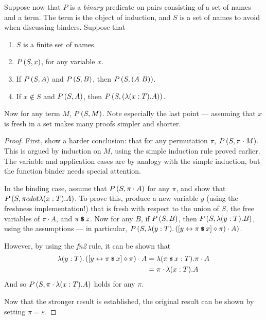 \begin{lemma}
Suppose now that \(P\) is a \emph{binary} predicate on pairs consisting of a set of names and a term.
The term is the object of induction, and \(S\) is a set of names to avoid when discussing binders.
Suppose that
\begin{enumerate}
\item
\(S\) is a finite set of names.
\item
\(P\left(S, x\right)\), for any variable \(x\).
\item
If \(P\left(S, A\right)\) and \(P\left(S, B\right)\), then \(P\left(S, \left(A\ B\right)\right)\).
\item
If \(x \notin S\) and \(P\left(S, A\right)\), then \(P\left(S, \left(\lambda (x:T). A\right)\right)\).
\end{enumerate}
Now for any term \(M\), \(P\left(S, M\right)\).
Note especially the last point --- assuming that \(x\) is fresh in a set makes many proofs simpler and shorter.
\end{lemma}
\begin{proof}
First, show a harder conclusion: that for any permutation \(\pi\), \(P\left(S, \pi \cdot M\right)\).
This is argued by induction on \(M\), using the simple induction rule proved earlier.
The variable and application cases are by analogy with the simple induction, but the function binder needs special attention.

In the binding case, assume that \(P\left(S, \pi \cdot A\right)\) for any \(\pi\), and show that \(P\left(S, \pi cdot \lambda (x:T).A\right)\).
To prove this, produce a new variable \(y\) (using the freshness implementation!) that is fresh with respect to the union of \(S\), the free variables of \(\pi \cdot A\), and \(\pi \mathbin{\textrm{\footnotesize{\textbf{\$}}}} z\).
Now for any \(B\), if \(P\left(S, B\right)\), then \(P\left(S, \lambda (y:T).B\right)\), using the assumptions --- in particular, \(P\left(S, \lambda (y:T). \left([y \leftrightarrow \pi \mathbin{\textrm{\footnotesize{\textbf{\$}}}} x] \diamond \pi\right) \cdot A\right)\).

However, by using the \emph{fn2} rule, it can be shown that
\begin{align*}
\lambda (y:T). \left([y \leftrightarrow \pi \mathbin{\textrm{\footnotesize{\textbf{\$}}}} x] \diamond \pi\right) \cdot A
&= \lambda (\pi \mathbin{\textrm{\footnotesize{\textbf{\$}}}} x:T). \pi \cdot A\\
&= \pi \cdot \lambda (x:T). A
\end{align*}
And so \(P\left(S, \pi \cdot \lambda (x:T).A\right)\) holds for any \(\pi\).

Now that the stronger result is established, the original result can be shown by setting \(\pi = \varepsilon\).
\end{proof}

